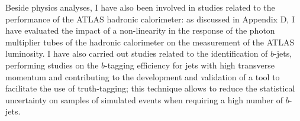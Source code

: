 \documentclass[11pt,a4paper]{article}
\begin{document}
Beside physics analyses, I have also been involved in studies related to the performance of the ATLAS hadronic calorimeter: 
as discussed in Appendix D, I have evaluated the impact of a non-linearity in the response of the photon multiplier tubes of the 
hadronic calorimeter on the measurement of the ATLAS luminosity. 
I have also carried out studies related to the identification of $b$-jets, 
performing studies on the $b$-tagging efficiency for jets with high transverse momentum and contributing to 
the development and validation of a tool to facilitate the use of truth-tagging; this technique 
allows to reduce the statistical uncertainty on samples of simulated events when requiring a high number of $b$-jets. 


\end{document}
